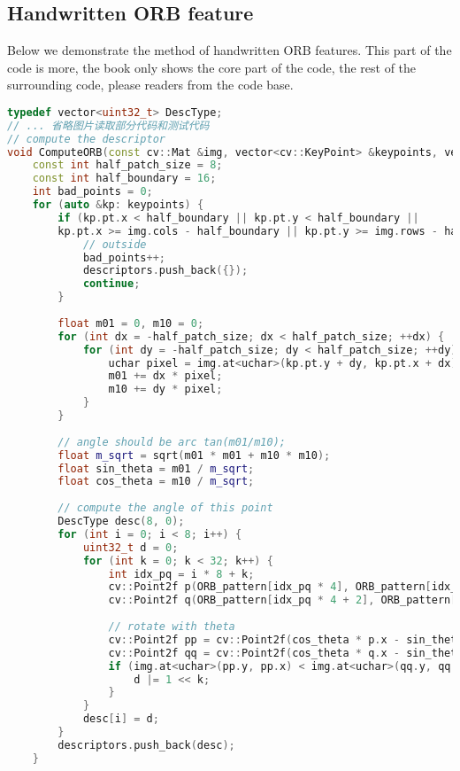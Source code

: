 \subsection{Handwritten ORB feature}
Below we demonstrate the method of handwritten ORB features. This part of the code is more, the book only shows the core part of the code, the rest of the surrounding code, please readers from the code base.
\begin{lstlisting}[language=c++,caption=slambook2/ch7/orb_self.cpp（片段）]
typedef vector<uint32_t> DescType;
// ... 省略图片读取部分代码和测试代码
// compute the descriptor
void ComputeORB(const cv::Mat &img, vector<cv::KeyPoint> &keypoints, vector<DescType> &descriptors) {
    const int half_patch_size = 8;
    const int half_boundary = 16;
    int bad_points = 0;
    for (auto &kp: keypoints) {
        if (kp.pt.x < half_boundary || kp.pt.y < half_boundary ||
        kp.pt.x >= img.cols - half_boundary || kp.pt.y >= img.rows - half_boundary) {
            // outside
            bad_points++;
            descriptors.push_back({});
            continue;
        }
    
        float m01 = 0, m10 = 0;
        for (int dx = -half_patch_size; dx < half_patch_size; ++dx) {
            for (int dy = -half_patch_size; dy < half_patch_size; ++dy) {
                uchar pixel = img.at<uchar>(kp.pt.y + dy, kp.pt.x + dx);
                m01 += dx * pixel;
                m10 += dy * pixel;
            }
        }
    
        // angle should be arc tan(m01/m10);
        float m_sqrt = sqrt(m01 * m01 + m10 * m10);
        float sin_theta = m01 / m_sqrt;
        float cos_theta = m10 / m_sqrt;
        
        // compute the angle of this point
        DescType desc(8, 0);
        for (int i = 0; i < 8; i++) {
            uint32_t d = 0;
            for (int k = 0; k < 32; k++) {
                int idx_pq = i * 8 + k;
                cv::Point2f p(ORB_pattern[idx_pq * 4], ORB_pattern[idx_pq * 4 + 1]);
                cv::Point2f q(ORB_pattern[idx_pq * 4 + 2], ORB_pattern[idx_pq * 4 + 3]);
        
                // rotate with theta
                cv::Point2f pp = cv::Point2f(cos_theta * p.x - sin_theta * p.y, sin_theta * p.x + cos_theta * p.y) + kp.pt;
                cv::Point2f qq = cv::Point2f(cos_theta * q.x - sin_theta * q.y, sin_theta * q.x + cos_theta * q.y) + kp.pt;
                if (img.at<uchar>(pp.y, pp.x) < img.at<uchar>(qq.y, qq.x)) {
                    d |= 1 << k;
                }
            }
            desc[i] = d;
        }
        descriptors.push_back(desc);
    }
    

\end{lstlisting}
